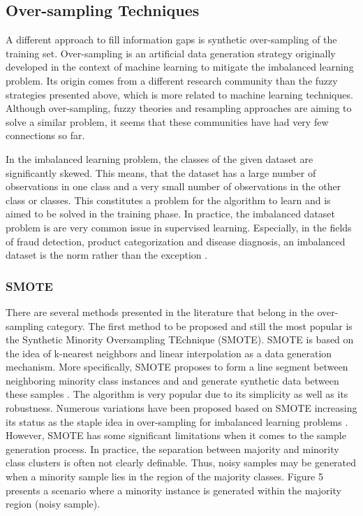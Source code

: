 \documentclass[parskip=full]{scrartcl}
\begin{document}
\subsection{Over-sampling Techniques}

A different approach to fill information gaps is synthetic over-sampling of the training set. 
Over-sampling is an artificial data generation strategy originally developed in the context of machine 
learning to mitigate the imbalanced learning problem. Its origin comes from a different research 
community than the fuzzy strategies presented above, which is more related to machine learning
techniques. Although over-sampling, fuzzy theories and resampling approaches are aiming to solve a 
similar problem, it seems that these communities have had very few connections so far. 

In the imbalanced learning problem, the classes of the given dataset are significantly skewed. This 
means, that the dataset has a large number of observations in one class and a very small number of 
observations in the other class or classes. This constitutes a problem for the algorithm to learn and is 
aimed to be solved in the training phase. In practice, the imbalanced dataset problem is are very 
common issue in supervised learning. Especially, in the fields of fraud detection, product categorization 
and disease diagnosis, an imbalanced dataset is the norm rather than the exception \cite{He.2013}. 

\subsubsection{SMOTE}

There are several methods presented in the literature that belong in the over-sampling category. The 
first method to be  proposed and still the most popular is the Synthetic Minority Oversampling 
TEchnique (SMOTE). SMOTE is based on the idea of k-nearest neighbors and linear interpolation as a 
data generation mechanism. More specifically, SMOTE proposes to form a line segment between 
neighboring minority class instances and and generate synthetic data between these samples 
\cite{Chawla.2002}. The algorithm is very popular due to its simplicity as well as its robustness. 
Numerous variations have been proposed based on SMOTE increasing its status as the staple idea in 
over-sampling for imbalanced learning problems \cite{Fernandez.2018}. However, SMOTE has some 
significant limitations when it comes to the sample generation process. In practice, the separation 
between majority and minority class clusters is often not clearly definable. Thus, noisy samples may be 
generated when a minority sample lies in the region of the majority classes. Figure 5 presents a 
scenario where a minority instance is generated within the majority region (noisy sample).
\end{document}
